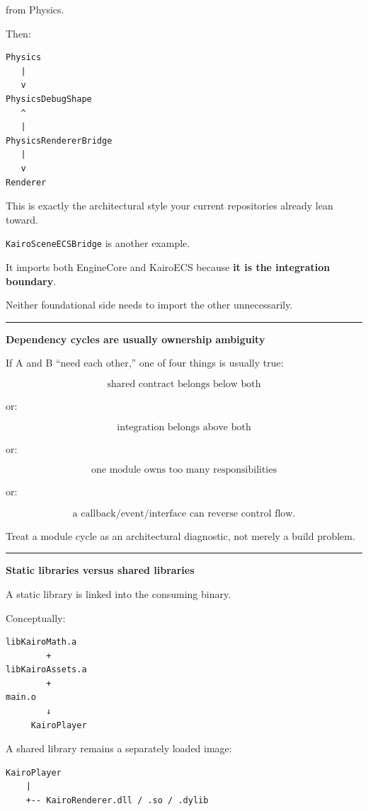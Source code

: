 from Physics.

Then:

\begin{verbatim}
Physics
   |
   v
PhysicsDebugShape
   ^
   |
PhysicsRendererBridge
   |
   v
Renderer
\end{verbatim}

This is exactly the architectural style your current repositories already lean toward.

\texttt{KairoSceneECSBridge} is another example.

It imports both EngineCore and KairoECS because \textbf{it is the integration boundary}.

Neither foundational side needs to import the other unnecessarily.

\begin{center}\rule{0.5\linewidth}{0.5pt}\end{center}

\textbf{Dependency cycles are usually ownership ambiguity}

If A and B ``need each other,'' one of four things is usually true:

\[
\text{shared contract belongs below both}
\]

or:

\[
\text{integration belongs above both}
\]

or:

\[
\text{one module owns too many responsibilities}
\]

or:

\[
\text{a callback/event/interface can reverse control flow}.
\]

Treat a module cycle as an architectural diagnostic, not merely a build problem.

\begin{center}\rule{0.5\linewidth}{0.5pt}\end{center}

\textbf{Static libraries versus shared libraries}

A static library is linked into the consuming binary.

Conceptually:

\begin{verbatim}
libKairoMath.a
        +
libKairoAssets.a
        +
main.o
        ↓
     KairoPlayer
\end{verbatim}

A shared library remains a separately loaded image:

\begin{verbatim}
KairoPlayer
    |
    +-- KairoRenderer.dll / .so / .dylib
\end{verbatim}

